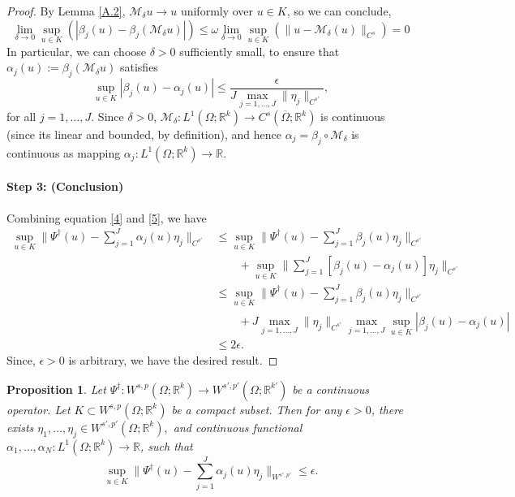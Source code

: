 \documentclass[reqno]{amsart}
\theoremstyle{plain}
\newtheorem{prop}{Proposition}
\theoremstyle{definition}
\newcommand{\bb}[1]{\mathbb{#1}}
\newcommand{\cal}[1]{\mathcal{#1}}
\begin{document}
\begin{proof}
    By Lemma \ref{A.2}, $\cal M_\delta u \to u$ uniformly over $u \in K$, so we can conclude,
    $$ \lim_{\delta \to 0} \sup\limits_{u \in K}(|\beta_j(u) - \beta_j(\cal M_\delta u)|) \leq \omega \lim_{\delta \to 0}\sup\limits_{u \in K} \left(\|u - \cal M_\delta (u)\|_{C^s}\right) = 0$$
    In particular, we can choose $\delta > 0$ sufficiently small, to ensure that $\alpha_j(u) := \beta_j(\cal M_\delta u)$ satisfies 
    \begin{equation} \label{5}
        \sup_{u \in K}|\beta_j(u) - \alpha_j(u)| \leq \frac{\epsilon}{J \max_{j = 1,\dots,J}\|\eta_j\|_{C^{s'}}},
    \end{equation}
    for all $j = 1, \dots, J$. Since $\delta > 0$, $\cal M_\delta : L^1(\Omega;\bb R^k) \to C^s(\overline{\Omega};\bb R^k)$ is continuous (since its linear and bounded, by definition), and hence $\alpha_j = \beta_j \circ \cal M_\delta$ is continuous as mapping $\alpha_j : L^1(\Omega;\bb R^k) \to \bb R.$
    \paragraph{\bf Step 3: (Conclusion)} Combining equation \ref{4} and \ref{5}, we have 
    $$
    \begin{aligned}
        \sup\limits_{u \in K} \|\Psi^\dag(u) - \sum_{j=1}^{J} \alpha_j(u)\eta_j\|_{C^{s'}} &\leq \sup\limits_{u \in K} \|\Psi^\dag(u) - \sum_{j=1}^{J}\beta_j(u)\eta_j\|_{C^{s'}}\\
        & \qquad + \sup\limits_{u \in K} \|\sum_{j=1}^{J}[\beta_j(u) - \alpha_j(u)]\eta_j\|_{C^{s'}}\\
        & \leq \sup\limits_{u \in K} \|\Psi^\dag(u) - \sum_{j=1}^{J} \beta_j(u) \eta_j\|_{C^{s'}} \\
        &\qquad + J \max\limits_{j=1,\dots,J} \|\eta_j\|_{C^{s'}} \max\limits_{j=1,\dots,J} \sup\limits_{u \in K} |\beta_j(u) - \alpha_j(u)| \\
        & \leq 2\epsilon.
    \end{aligned}
    $$
    Since, $\epsilon > 0$ is arbitrary, we have the desired result. 
\end{proof}
\begin{prop} \label{A.8}
    Let $\Psi^\dag : W^{s,p}(\Omega; \bb R^k) \to W^{s',p'}(\Omega;\bb R^{k'})$ be a continuous operator. Let $K \subset W^{s,p}(\Omega; \bb R^k)$ be a compact subset. Then for any $\epsilon > 0$, there exists $\eta_1, \dots, \eta_j \in W^{s',p'}(\Omega; \bb R^k),$ and continuous functional $\alpha_1, \dots, \alpha_N: L^1(\Omega; \bb R^k) \to \bb R$, such that 
    $$ \sup\limits_{u \in K} \|\Psi^\dag(u) - \sum_{j=1}^{J} \alpha_j(u)\eta_j\|_{W^{s',p'}} \leq \epsilon.$$
\end{prop}
\end{document}
